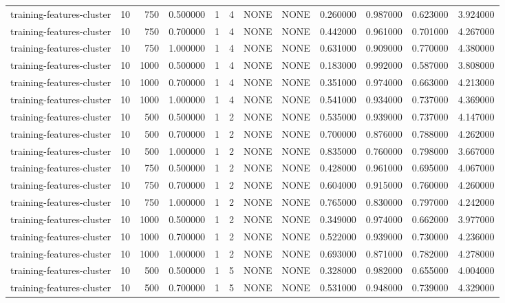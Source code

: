 \begin{tabular}{lrrrllllrrrr}
training-features-cluster & 10 & 750 & 0.500000 & 1 & 4 & NONE & NONE & 0.260000 & 0.987000 & 0.623000 & 3.924000 \\
training-features-cluster & 10 & 750 & 0.700000 & 1 & 4 & NONE & NONE & 0.442000 & 0.961000 & 0.701000 & 4.267000 \\
training-features-cluster & 10 & 750 & 1.000000 & 1 & 4 & NONE & NONE & 0.631000 & 0.909000 & 0.770000 & 4.380000 \\
training-features-cluster & 10 & 1000 & 0.500000 & 1 & 4 & NONE & NONE & 0.183000 & 0.992000 & 0.587000 & 3.808000 \\
training-features-cluster & 10 & 1000 & 0.700000 & 1 & 4 & NONE & NONE & 0.351000 & 0.974000 & 0.663000 & 4.213000 \\
training-features-cluster & 10 & 1000 & 1.000000 & 1 & 4 & NONE & NONE & 0.541000 & 0.934000 & 0.737000 & 4.369000 \\
training-features-cluster & 10 & 500 & 0.500000 & 1 & 2 & NONE & NONE & 0.535000 & 0.939000 & 0.737000 & 4.147000 \\
training-features-cluster & 10 & 500 & 0.700000 & 1 & 2 & NONE & NONE & 0.700000 & 0.876000 & 0.788000 & 4.262000 \\
training-features-cluster & 10 & 500 & 1.000000 & 1 & 2 & NONE & NONE & 0.835000 & 0.760000 & 0.798000 & 3.667000 \\
training-features-cluster & 10 & 750 & 0.500000 & 1 & 2 & NONE & NONE & 0.428000 & 0.961000 & 0.695000 & 4.067000 \\
training-features-cluster & 10 & 750 & 0.700000 & 1 & 2 & NONE & NONE & 0.604000 & 0.915000 & 0.760000 & 4.260000 \\
training-features-cluster & 10 & 750 & 1.000000 & 1 & 2 & NONE & NONE & 0.765000 & 0.830000 & 0.797000 & 4.242000 \\
training-features-cluster & 10 & 1000 & 0.500000 & 1 & 2 & NONE & NONE & 0.349000 & 0.974000 & 0.662000 & 3.977000 \\
training-features-cluster & 10 & 1000 & 0.700000 & 1 & 2 & NONE & NONE & 0.522000 & 0.939000 & 0.730000 & 4.236000 \\
training-features-cluster & 10 & 1000 & 1.000000 & 1 & 2 & NONE & NONE & 0.693000 & 0.871000 & 0.782000 & 4.278000 \\
training-features-cluster & 10 & 500 & 0.500000 & 1 & 5 & NONE & NONE & 0.328000 & 0.982000 & 0.655000 & 4.004000 \\
training-features-cluster & 10 & 500 & 0.700000 & 1 & 5 & NONE & NONE & 0.531000 & 0.948000 & 0.739000 & 4.329000 \\

\end{tabular}
